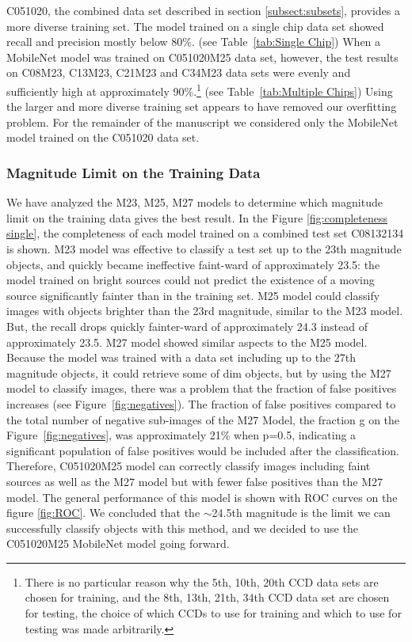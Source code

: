 C051020, the combined data set described in section \ref{subsect:subsets}, provides a more diverse training set. 
The model trained on a single chip data set showed recall and precision mostly below 80\%. (see Table~\ref{tab:Single Chip})
When a MobileNet model was trained on C051020M25 data set, however, the test results on C08M23, C13M23, C21M23 and C34M23 data sets were evenly and sufficiently high at approximately 90\%.\footnote{There is no particular reason why the 5th, 10th, 20th CCD data sets are chosen for training, and the 8th, 13th, 21th, 34th CCD data set are chosen for testing, the choice of which CCDs to use for training and which to use for testing was made arbitrarily.} (see Table~\ref{tab:Multiple Chips})
Using the larger and more diverse training set appears to have removed our overfitting problem.
For the remainder of the manuscript we considered only the MobileNet model trained on the C051020 data set.

\subsubsection{Magnitude Limit on the Training Data}
\label{subsubsect: Magnitude Limit on the Training Data}
We have analyzed the M23, M25, M27 models to determine which magnitude limit on the training data gives the best result.
In the Figure \ref{fig:completeness single}, the completeness of each model trained on a combined test set C08132134 is shown.
M23 model was effective to classify a test set up to the 23th magnitude objects, and quickly became ineffective faint-ward of approximately 23.5: the model trained on bright sources could not predict the existence of a moving source significantly fainter than in the training set.
M25 model could classify images with objects brighter than the 23rd magnitude, similar to the M23 model.
But, the recall drops quickly fainter-ward of approximately 24.3 instead of approximately 23.5.
M27 model showed similar aspects to the M25 model.
Because the model was trained with a data set including up to the 27th magnitude objects, it could retrieve some of dim objects, but by using the M27 model to classify images, there was a problem that the fraction of false positives increases (see Figure~\ref{fig:negatives}).
The fraction of false positives compared to the total number of negative sub-images of the M27 Model, the fraction g on the Figure~\ref{fig:negatives}, was approximately 21\% when p=0.5, indicating a significant population of false positives would be included after the classification.
Therefore, C051020M25 model can correctly classify images including faint sources as well as the M27 model but with fewer false positives than the M27 model.
The general performance of this model is shown with ROC curves on the figure \ref{fig:ROC}.
We concluded that the $\sim$24.5th magnitude is the limit we can successfully classify objects with this method, and we decided to use the C051020M25 MobileNet model going forward.

